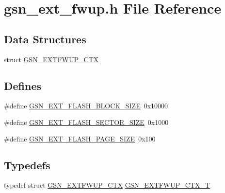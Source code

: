\hypertarget{a00498}{
\section{gsn\_\-ext\_\-fwup.h File Reference}
\label{a00498}
}
\subsection*{Data Structures}
\begin{DoxyCompactItemize}
\item 
struct \hyperlink{a00072}{GSN\_\-EXTFWUP\_\-CTX}
\end{DoxyCompactItemize}
\subsection*{Defines}
\begin{DoxyCompactItemize}
\item 
\#define \hyperlink{a00498_ace68eb38afc72f76d4e0bc25e88e0849}{GSN\_\-EXT\_\-FLASH\_\-BLOCK\_\-SIZE}~0x10000
\item 
\#define \hyperlink{a00498_a86beb90de698b83fc2a4799ada726c35}{GSN\_\-EXT\_\-FLASH\_\-SECTOR\_\-SIZE}~0x1000
\item 
\#define \hyperlink{a00498_a4accdf7cd930cf0f67d1023488e4cf0b}{GSN\_\-EXT\_\-FLASH\_\-PAGE\_\-SIZE}~0x100
\end{DoxyCompactItemize}
\subsection*{Typedefs}
\begin{DoxyCompactItemize}
\item 
typedef struct \hyperlink{a00072}{GSN\_\-EXTFWUP\_\-CTX} \hyperlink{a00498_ac6615802399bc0ad64b060c05fa3e561}{GSN\_\-EXTFWUP\_\-CTX\_\-T}
\end{DoxyCompactItemize}
